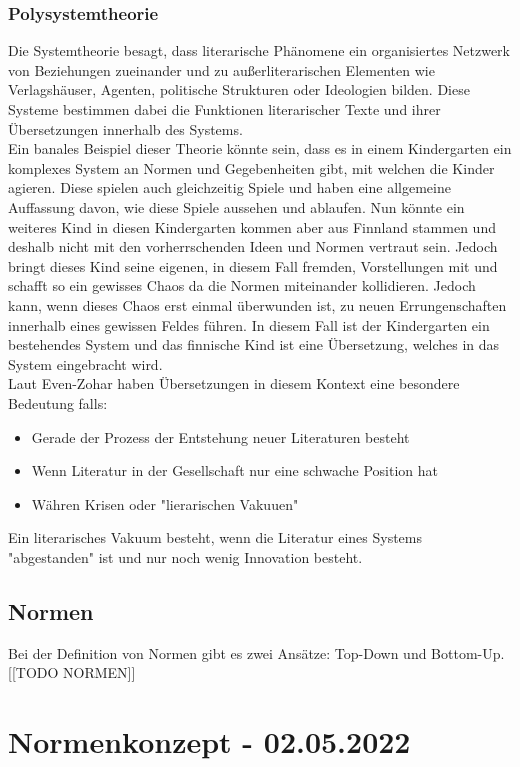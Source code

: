 \documentclass{article}
\begin{document}
	\subsubsection{Polysystemtheorie}
	Die Systemtheorie besagt, dass literarische Phänomene ein organisiertes Netzwerk von Beziehungen zueinander und zu außerliterarischen Elementen wie Verlagshäuser, Agenten, politische Strukturen oder Ideologien bilden. Diese Systeme bestimmen dabei die Funktionen literarischer Texte und ihrer Übersetzungen innerhalb des Systems. \\
	Ein banales Beispiel dieser Theorie könnte sein, dass es in einem Kindergarten ein komplexes System an Normen und Gegebenheiten gibt, mit welchen die Kinder agieren. Diese spielen auch gleichzeitig Spiele und haben eine allgemeine Auffassung davon, wie diese Spiele aussehen und ablaufen. Nun könnte ein weiteres Kind in diesen Kindergarten kommen aber aus Finnland stammen und deshalb nicht mit den vorherrschenden Ideen und Normen vertraut sein. Jedoch bringt dieses Kind seine eigenen, in diesem Fall fremden, Vorstellungen mit und schafft so ein gewisses Chaos da die Normen miteinander kollidieren. Jedoch kann, wenn dieses Chaos erst einmal überwunden ist, zu neuen Errungenschaften innerhalb eines gewissen Feldes führen. In diesem Fall ist der Kindergarten ein bestehendes System und das finnische Kind ist eine Übersetzung, welches in das System eingebracht wird. \\
	Laut Even-Zohar haben Übersetzungen in diesem Kontext eine besondere Bedeutung falls:
	\begin{itemize}
		\item{Gerade der Prozess der Entstehung neuer Literaturen besteht}
		\item{Wenn Literatur in der Gesellschaft nur eine schwache Position hat}
		\item{Währen Krisen oder "lierarischen Vakuuen"}
	\end{itemize}

	Ein literarisches Vakuum besteht, wenn die Literatur eines Systems "abgestanden" ist und nur noch wenig Innovation besteht. \\
	\subsection{Normen}
	Bei der Definition von Normen gibt es zwei Ansätze: Top-Down und Bottom-Up.
	[[TODO NORMEN]]

	\section{Normenkonzept - 02.05.2022}
\end{document}

